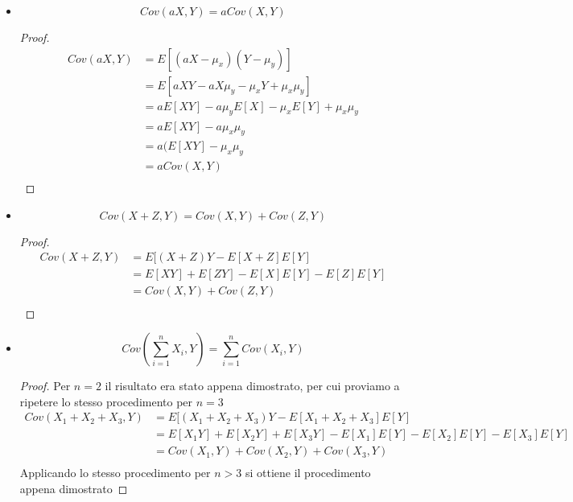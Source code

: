 \documentclass[a4paper,12pt, oneside]{book}
\begin{document}
\begin{itemize}
    \item \[ Cov(aX, Y) = aCov(X, Y) \]
        \begin{proof}
            \[ \begin{split}
                Cov(aX, Y) & = E[(aX - \mu_x)(Y - \mu_y)] \\
                           & = E[aXY - aX\mu_y - \mu_xY + \mu_x\mu_y]\\
                           & = aE[XY] - a\mu_yE[X] - \mu_xE[Y] + \mu_x\mu_y\\
                           & = aE[XY] - a\mu_x\mu_y \\
                           & = a(E[XY] - \mu_x\mu_y \\
                           & = aCov(X, Y)\\
                \end{split} \]
        \end{proof}
    \item \[ Cov(X + Z, Y) = Cov(X, Y) + Cov(Z, Y) \]
          \begin{proof}
              \[ \begin{split}
                  Cov(X + Z, Y) & = E[(X + Z)Y - E[X + Z]E[Y] \\
                                & = E[XY] + E[ZY] - E[X]E[Y] - E[Z]E[Y] \\
                                & = Cov(X, Y) + Cov(Z, Y)\\
                 \end{split} \]
          \end{proof}
    \item \[ Cov(\sum _{i = 1}^n X_i, Y) = \sum _{i = 1}^n Cov(X_i, Y) \]
          \begin{proof}
            Per $n = 2$ il risultato era stato appena dimostrato, per cui proviamo a ripetere lo stesso procedimento per $n = 3$
              \[ \begin{split}
                  Cov(X_1 + X_2 + X_3, Y) & = E[(X_1 + X_2 + X_3)Y - E[X_1 + X_2 + X_3]E[Y]\\
                                          & = E[X_1Y] + E[X_2Y] + E[X_3Y] - E[X_1]E[Y] - E[X_2]E[Y] - E[X_3]E[Y]\\
                                          & = Cov(X_1, Y) + Cov(X_2, Y) + Cov(X_3, Y)\\
                  \end{split} \]
              Applicando lo stesso procedimento per $n > 3$ si ottiene il procedimento appena dimostrato

\end{proof}
\end{itemize}
\end{document}
